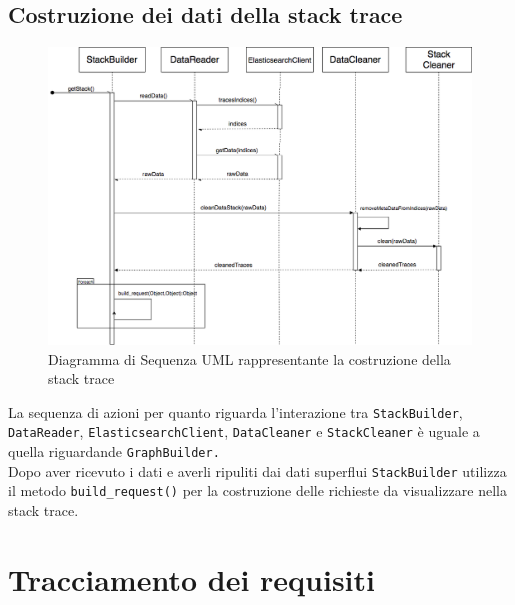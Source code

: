 \subsection{Costruzione dei dati della stack trace}
\begin{figure}[H]
	\centering
	\includegraphics[width=1\textwidth]{Images/DiagrammaSequenzaStack.png}
	\caption{Diagramma di Sequenza UML rappresentante la costruzione della stack trace}
	\label{img:seqGraph}
\end{figure}
La sequenza di azioni per quanto riguarda l'interazione tra \texttt{StackBuilder}, \texttt{DataReader}, \texttt{ElasticsearchClient}, \texttt{DataCleaner} e \texttt{StackCleaner} è uguale a quella riguardande \texttt{GraphBuilder.}\\
Dopo aver ricevuto i dati e averli ripuliti dai dati superflui \texttt{StackBuilder} utilizza il metodo \texttt{build\_request()} per la costruzione delle richieste da visualizzare nella stack trace.


\section{Tracciamento dei requisiti}

